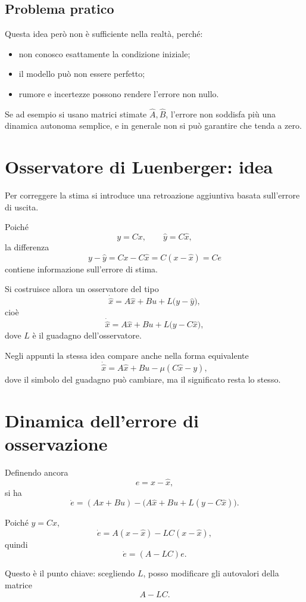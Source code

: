 \subsection*{Problema pratico}

Questa idea però non è sufficiente nella realtà, perché:
\begin{itemize}
    \item non conosco esattamente la condizione iniziale;
    \item il modello può non essere perfetto;
    \item rumore e incertezze possono rendere l'errore non nullo.
\end{itemize}

Se ad esempio si usano matrici stimate \(\hat A,\hat B\), l'errore non soddisfa più una dinamica autonoma semplice,
e in generale non si può garantire che tenda a zero.

\section{Osservatore di Luenberger: idea}

Per correggere la stima si introduce una retroazione aggiuntiva basata sull'errore di uscita.

Poiché
\[
y=Cx,
\qquad
\hat y=C\hat x,
\]
la differenza
\[
y-\hat y = Cx-C\hat x = C(x-\hat x)=Ce
\]
contiene informazione sull'errore di stima.

Si costruisce allora un osservatore del tipo
\[
\dot{\hat x}=A\hat x+Bu+L\bigl(y-\hat y\bigr),
\]
cioè
\[
\dot{\hat x}=A\hat x+Bu+L\bigl(y-C\hat x\bigr),
\]
dove \(L\) è il guadagno dell'osservatore.

Negli appunti la stessa idea compare anche nella forma equivalente
\[
\dot{\hat x}=A\hat x+Bu-\mu(C\hat x-y),
\]
dove il simbolo del guadagno può cambiare, ma il significato resta lo stesso.

\section{Dinamica dell'errore di osservazione}

Definendo ancora
\[
e=x-\hat x,
\]
si ha
\[
\dot e
=
(Ax+Bu)-\bigl(A\hat x+Bu+L(y-C\hat x)\bigr).
\]

Poiché \(y=Cx\),
\[
\dot e=A(x-\hat x)-LC(x-\hat x),
\]
quindi
\[
\dot e=(A-LC)e.
\]

Questo è il punto chiave:
scegliendo \(L\), posso modificare gli autovalori della matrice
\[
A-LC.
\]

